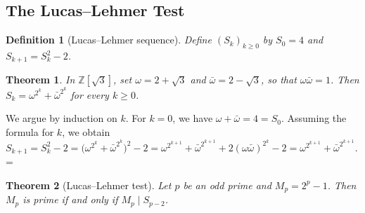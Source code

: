 \documentclass[11pt]{article}
\makeatletter
\theoremstyle{ntstyle}
\newtheorem{theorem}{Theorem}[subsection]
\newtheorem{definition}{Definition}[subsection]
\let\nt@closedisplay\]
\def\nt@guardedclose{\@ifnextchar\par{\nt@closeafterpar}{\@ifnextchar\end{\postdisplaypenalty\@M\nt@closedisplay}{\nt@closedisplay}}}
\def\nt@closeafterpar\par{\@ifnextchar\par{\nt@closeafterpar}{\@ifnextchar\end{\postdisplaypenalty\@M\nt@closedisplay\par}{\nt@closedisplay\par}}}
\renewenvironment{proof}[1][\proofname]{\par
  \pushQED{\qed}\normalfont\topsep\medskipamount\edef\nt@afterproof{\@endparpenalty=\the\@endparpenalty\relax}\@beginparpenalty\@M\@endparpenalty\@M\let\]\nt@guardedclose\trivlist\item[]\textit{#1\@addpunct{.}} \ignorespaces}{\ifvmode\addpenalty\@M\fi\popQED\nt@afterproof\endtrivlist\@endpefalse}
\makeatother
\begin{document}
\subsection{The Lucas--Lehmer Test}

\begin{definition}[Lucas--Lehmer sequence]\label{def:9.3.1} Define
	$(S_k)_{k\ge0}$ by $S_0=4$ and $S_{k+1}=S_k^2-2$.
\end{definition}
\begin{theorem}\label{thm:9.3.1} In
	$\mathbb{Z}[\sqrt{3}]$, set $\omega=2+\sqrt{3}$ and $\bar\omega=2-\sqrt{3}$,
	so that $\omega\bar\omega=1$. Then
	$S_k=\omega^{2^k}+\bar\omega^{2^k}$ for every $k\ge0$.
\end{theorem}

\begin{proof} We argue by induction on $k$. For $k=0$,
	we have $\omega+\bar\omega=4=S_0$. Assuming the formula for $k$, we obtain
	$S_{k+1}=S_k^2-2=\big(\omega^{2^k}+\bar\omega^{2^k}\big)^2-2=\omega^{2^{k+1}}+\bar\omega^{2^{k+1}}+2(\omega\bar\omega)^{2^k}-2=\omega^{2^{k+1}}+\bar\omega^{2^{k+1}}$.
\end{proof}
\begin{theorem}[Lucas--Lehmer test]\label{thm:9.3.2} Let $p$ be an
	odd prime and $M_p=2^p-1$. Then $M_p$ is prime if and only if $M_p\mid S_{p-2}$.
\end{theorem}
\end{document}
